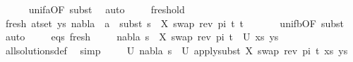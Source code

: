 \begin{isabellebody}
\ \ \ \ \isamarkupfalse%
\ unif{\isacharunderscore}{\kern0pt}{}a{\isacharbrackleft}{\kern0pt}OF\ subst{\isacharbrackright}{\kern0pt}\ \isamarkupfalse%
\ auto\isanewline
\isanewline
\ \ \ \isamarkupfalse%
\ fresh{\isacharunderscore}{\kern0pt}old\ \isanewline
\ \ \ \isamarkupfalse%
\ fresh{\isacharcolon}{\kern0pt}\ {\isachardoublequoteopen}{\isasymforall}{\isacharparenleft}{\kern0pt}a{\isacharcomma}{\kern0pt}t{\isacharparenright}{\kern0pt}{\isasymin}set\ ys{\isachardot}{\kern0pt}\ nabla{}\ {\isasymturnstile}\ a\ {\isasymsharp}\ subst\ {\isacharparenleft}{\kern0pt}s{}\ {\isasymbullet}\ {\isacharbrackleft}{\kern0pt}{\isacharparenleft}{\kern0pt}X{\isacharcomma}{\kern0pt}\ swap\ {\isacharparenleft}{\kern0pt}rev\ pi{\isacharparenright}{\kern0pt}\ t{\isacharprime}{\kern0pt}{\isacharparenright}{\kern0pt}{\isacharbrackright}{\kern0pt}{\isacharparenright}{\kern0pt}\ t{\isachardoublequoteclose}\isanewline
\ \ \ \ \ \isamarkupfalse%
\ unif{\isacharunderscore}{\kern0pt}{}b{\isacharbrackleft}{\kern0pt}OF\ subst{\isacharbrackright}{\kern0pt}\ \isamarkupfalse%
\ auto\isanewline
\isanewline
\ \ \ \isamarkupfalse%
\ eqs\ fresh\isanewline
\ \ \ \isamarkupfalse%
\ {\isachardoublequoteopen}{\isacharparenleft}{\kern0pt}nabla{}{\isacharcomma}{\kern0pt}\ {\isacharparenleft}{\kern0pt}s{}\ {\isasymbullet}\ {\isacharbrackleft}{\kern0pt}{\isacharparenleft}{\kern0pt}X{\isacharcomma}{\kern0pt}\ swap\ {\isacharparenleft}{\kern0pt}rev\ pi{\isacharparenright}{\kern0pt}\ t{\isacharprime}{\kern0pt}{\isacharparenright}{\kern0pt}{\isacharbrackright}{\kern0pt}{\isacharparenright}{\kern0pt}{\isacharparenright}{\kern0pt}\ {\isasymin}\ U\ {\isacharparenleft}{\kern0pt}xs{\isacharcomma}{\kern0pt}\ ys{\isacharparenright}{\kern0pt}{\isachardoublequoteclose}\isanewline
\ \ \ \ \ \isamarkupfalse%
\ all{\isacharunderscore}{\kern0pt}solutions{\isacharunderscore}{\kern0pt}def\ \isamarkupfalse%
\ simp\isanewline
\ \ \ \isamarkupfalse%
\ U{\isacharcolon}{\kern0pt}\ {\isachardoublequoteopen}{\isacharparenleft}{\kern0pt}nabla{}{\isacharcomma}{\kern0pt}\ s{}{\isacharparenright}{\kern0pt}\ {\isasymin}\ U\ {\isacharparenleft}{\kern0pt}apply{\isacharunderscore}{\kern0pt}subst\ {\isacharbrackleft}{\kern0pt}{\isacharparenleft}{\kern0pt}X{\isacharcomma}{\kern0pt}\ swap\ {\isacharparenleft}{\kern0pt}rev\ pi{\isacharparenright}{\kern0pt}\ t{\isacharprime}{\kern0pt}{\isacharparenright}{\kern0pt}{\isacharbrackright}{\kern0pt}\ {\isacharparenleft}{\kern0pt}xs{\isacharcomma}{\kern0pt}\ ys{\isacharparenright}{\kern0pt}{\isacharparenright}{\kern0pt}{\isachardoublequoteclose}\isanewline

\end{isabellebody}
